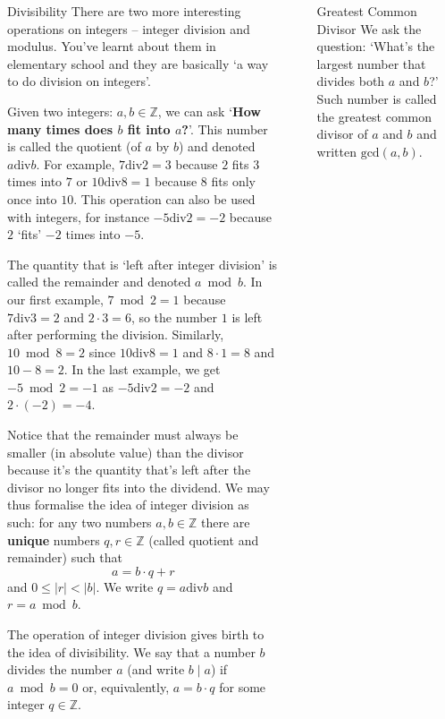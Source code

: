 \documentclass[final]{beamer}
\newlength{\sepwidth}
\newlength{\colwidth}
\newcommand{\separatorcolumn}{\begin{column}{\sepwidth}\end{column}}
\newcommand{\Z}{\mathbb{Z}}
\newcommand{\dv}{\mathbin{\mathrm{div}}}
\begin{document}
\begin{frame}[t]
\begin{columns}[t]
\begin{column}{\colwidth}
\begin{alertblock}{Divisibility}
 There are two more interesting operations on integers -- \alert{integer
 division} and \alert{modulus}. You've learnt about them in elementary school
 and they are basically `a way to do \alert{division on integers}'.

 Given two integers: $a,b \in \Z$, we can ask `\textbf{How many times does $b$
 fit into $a$?}'. This number is called the \alert{quotient} (of $a$ by $b$) and
 denoted \alert{$a \dv b$}. For example, $7 \dv 2 = 3$ because $2$ fits $3$
 times into $7$ or $10 \dv 8 = 1$ because $8$ fits only once into $10$. This
 operation can also be used with integers, for instance $-5 \dv 2 = -2$ because
 $2$ `fits' $-2$ times into $-5$.

 The quantity that is `left after integer division' is called the
 \alert{remainder} and denoted $a \bmod b$. In our first example, $7 \bmod 2 =
 1$ because $7 \dv 3 = 2$ and $2 \cdot 3 = 6$, so the number $1$ is left after
 performing the division. Similarly, $10 \bmod 8 = 2$ since $10 \dv 8 = 1$ and
 $8 \cdot 1 = 8$ and $10 - 8 = 2$. In the last example, we get $-5 \bmod 2 = -1$
 as $-5 \dv 2 = -2$ and $2 \cdot (-2) = -4$.

 Notice that the \alert{remainder must always be smaller (in absolute value)
 than the divisor} because it's the quantity that's left after the divisor no
 longer fits into the dividend. We may thus formalise the idea of \alert{integer
 division as such}: for any two numbers $a,b \in \Z$ there are \textbf{unique}
 numbers $q,r \in \Z$ (called \alert{quotient} and \alert{remainder}) such that
 \[
  a = b \cdot q + r
 \]
 and $0 \leq |r| < |b|$. We write $q = a \dv b$ and $r = a \bmod b$.

 The operation of integer division gives birth to the idea of
 \alert{divisibility}. We say that a number $b$ divides the number $a$ (and
 write $b \mid a$) if $a \bmod b = 0$ or, equivalently, $a = b \cdot q$ for some
 integer $q \in \Z$.
\end{alertblock}

\end{column}
\separatorcolumn

\begin{column}{\colwidth}

\begin{exampleblock}{Greatest Common Divisor}
 We ask the question: `What's the \alert{largest number that divides} both $a$
 and $b$?' Such number is called the \alert{greatest common divisor} of $a$ and
 $b$ and written $\mathrm{gcd}(a,b)$.


\end{exampleblock}
\end{column}
\end{columns}
\end{frame}
\end{document}

